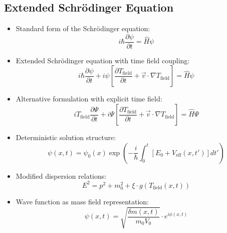 \documentclass[12pt,a4paper]{article}
\begin{document}
	\subsection{Extended Schrödinger Equation}
	\begin{itemize}
		\item Standard form of the Schrödinger equation:
		\begin{equation}
			i\hbar \frac{\partial \psi}{\partial t} = \hat{H}\psi
		\end{equation}
		
		\item Extended Schrödinger equation with time field coupling:
		\begin{equation}
			\boxed{i\hbar \frac{\partial\psi}{\partial t} + i\psi\left[\frac{\partial T_{\text{field}}}{\partial t} + \vec{v} \cdot \nabla T_{\text{field}}\right] = \hat{H}\psi}
		\end{equation}
		
		\item Alternative formulation with explicit time field:
		\begin{equation}
			\boxed{i T_{\text{field}} \frac{\partial\Psi}{\partial t} + i\Psi\left[\frac{\partial T_{\text{field}}}{\partial t} + \vec{v} \cdot \nabla T_{\text{field}}\right] = \hat{H}\Psi}
		\end{equation}
		
		\item Deterministic solution structure:
		\begin{equation}
			\psi(x,t) = \psi_0(x) \exp\left(-\frac{i}{\hbar} \int_0^t \left[E_0 + V_{\text{eff}}(x,t')\right] dt'\right)
		\end{equation}
		
		\item Modified dispersion relations:
		\begin{equation}
			E^2 = p^2 + m_0^2 + \xi \cdot g(T_{\text{field}}(x,t))
		\end{equation}
		
		\item Wave function as mass field representation:
		\begin{equation}
			\psi(x,t) = \sqrt{\frac{\delta m(x,t)}{m_0 V_0}} \cdot e^{i\phi(x,t)}
		\end{equation}
	\end{itemize}
	
\end{document}
